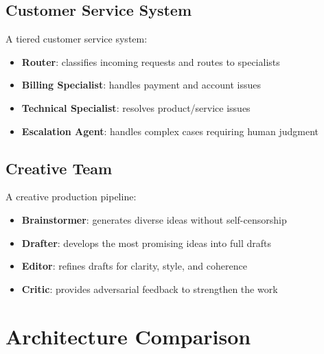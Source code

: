 \subsection{Customer Service System}
\label{customer-service-system}

A tiered customer service system:

\begin{itemize}
  \item \textbf{Router}: classifies incoming requests and routes to specialists
  \item \textbf{Billing Specialist}: handles payment and account issues
  \item \textbf{Technical Specialist}: resolves product/service issues
  \item \textbf{Escalation Agent}: handles complex cases requiring human judgment
\end{itemize}

\subsection{Creative Team}
\label{creative-team}

A creative production pipeline:

\begin{itemize}
  \item \textbf{Brainstormer}: generates diverse ideas without self-censorship
  \item \textbf{Drafter}: develops the most promising ideas into full drafts
  \item \textbf{Editor}: refines drafts for clarity, style, and coherence
  \item \textbf{Critic}: provides adversarial feedback to strengthen the work
\end{itemize}

\section{Architecture Comparison}
\label{subsec:mas-comparison}

